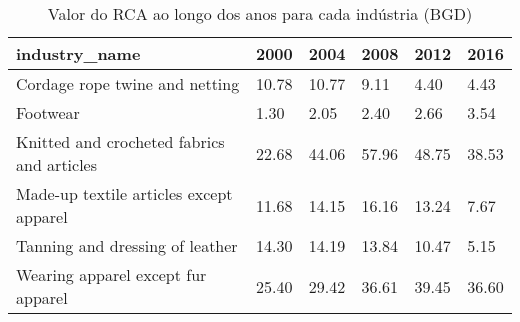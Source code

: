 \begin{table}
\centering
\caption{Valor do RCA ao longo dos anos para cada indústria (BGD)}
\begin{tabular}{p{6cm}p{1.5cm}p{1.5cm}p{1.5cm}p{1.5cm}p{1.5cm}}
\toprule
                             industry\_name &  2000 &  2004 &  2008 &  2012 &  2016 \\
\midrule
            Cordage rope twine and netting & 10.78 & 10.77 &  9.11 &  4.40 &  4.43 \\
                                  Footwear &  1.30 &  2.05 &  2.40 &  2.66 &  3.54 \\
Knitted and crocheted fabrics and articles & 22.68 & 44.06 & 57.96 & 48.75 & 38.53 \\
   Made-up textile articles except apparel & 11.68 & 14.15 & 16.16 & 13.24 &  7.67 \\
           Tanning and dressing of leather & 14.30 & 14.19 & 13.84 & 10.47 &  5.15 \\
        Wearing apparel except fur apparel & 25.40 & 29.42 & 36.61 & 39.45 & 36.60 \\
\bottomrule
\end{tabular}
\end{table}
